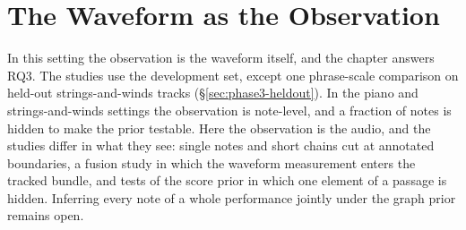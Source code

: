 \documentclass[11pt,a4paper]{report}
\begin{document}
\chapter{The Waveform as the Observation}\label{ch:phase3}\label{app:phase3}\label{sec:phase3-math}
In this setting the observation is the waveform itself, and the chapter
answers RQ3. The studies use the development set, except one phrase-scale
comparison on held-out strings-and-winds tracks (\S\ref{sec:phase3-heldout}).
In the piano and strings-and-winds settings the observation is note-level,
and a fraction of notes is hidden to make the prior testable. Here the
observation is the audio, and the studies differ in what they see: single
notes and short chains cut at annotated boundaries, a fusion study in which
the waveform measurement enters the tracked bundle, and tests of the score
prior in which one element of a passage is hidden. Inferring every note of a whole performance jointly
under the graph prior remains open.
\end{document}
